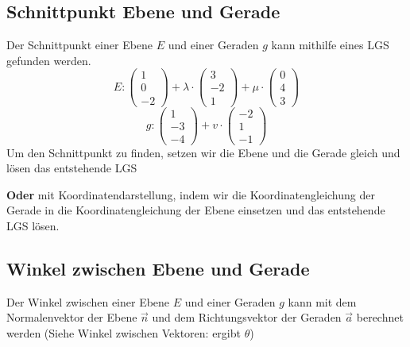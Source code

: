 \documentclass{article}
\begin{document}
\hfill
\begin{minipage}[t]{0.45\textwidth}
    \subsection*{Schnittpunkt Ebene und Gerade}
    Der Schnittpunkt einer Ebene \( E \) und einer Geraden \( g \) kann mithilfe eines LGS gefunden werden. 
    \begin{equation*}
        E: \begin{pmatrix}
            1 \\
            0 \\
            -2
        \end{pmatrix} + \lambda \cdot \begin{pmatrix}
            3 \\
            -2 \\
            1
        \end{pmatrix} + \mu \cdot \begin{pmatrix}
            0 \\
            4 \\
            3
        \end{pmatrix}
    \end{equation*}
    \begin{equation*}
        g: \begin{pmatrix}
            1 \\
            -3 \\
            -4
            \end{pmatrix} + v \cdot \begin{pmatrix}
                -2 \\
                1 \\
                -1
            \end{pmatrix}
    \end{equation*}
    Um den Schnittpunkt zu finden, setzen wir die Ebene und die Gerade gleich und lösen das entstehende LGS

    \textbf{Oder} mit Koordinatendarstellung, indem wir die Koordinatengleichung der Gerade in die Koordinatengleichung der Ebene einsetzen und das entstehende LGS lösen.

    \subsection*{Winkel zwischen Ebene und Gerade}
    Der Winkel zwischen einer Ebene \( E \) und einer Geraden \( g \) kann mit dem Normalenvektor der Ebene \( \vec{n} \) und dem Richtungsvektor der Geraden \( \vec{a} \) berechnet werden
    (Siehe Winkel zwischen Vektoren: ergibt  \( \theta \))
    

\end{minipage}
\end{document}

